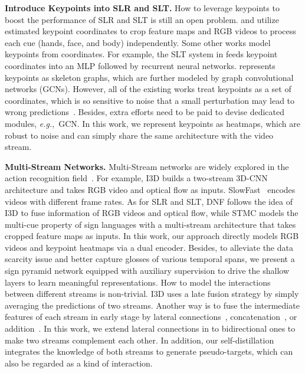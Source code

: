 \documentclass{article}
\def\eg{\emph{e.g.}} \def\Eg{\emph{E.g.}}
\begin{document}
\textbf{Introduce Keypoints into SLR and SLT.}
How to leverage keypoints to boost the performance of SLR and SLT is still an open problem.
\cite{STMC_MM} and \cite{papadimitriou20_interspeech} utilize estimated keypoint coordinates to crop feature maps and RGB videos to process each cue (hands, face, and body) independently.
Some other works \cite{NSLT_keypoint, Camg2020Multichannel, mseqgraph} model keypoints from coordinates.
For example, the SLT system in \cite{NSLT_keypoint} feeds keypoint coordinates into an MLP followed by recurrent neural networks. \cite{mseqgraph} represents keypoints as skeleton graphs, which are further modeled by graph convolutional networks (GCNs).
However, all of the existing works treat keypoints as a set of coordinates, which is so sensitive to noise that a small perturbation may lead to wrong predictions~\cite{duan2021revisiting}.
Besides, extra efforts need to be paid to devise dedicated modules, \eg,~GCN.
In this work, we represent keypoints as heatmaps, which are robust to noise and can simply share the same architecture with the video stream.

\textbf{Multi-Stream Networks.} Multi-Stream networks are widely explored in the action recognition field~\cite{simonyan2014two, feichtenhofer2016convolutional, carreira2017quo, zolfaghari2017chained, feichtenhofer2019slowfast}. For example, I3D \cite{carreira2017quo} builds a two-stream 3D-CNN architecture and takes RGB video and optical flow as inputs. SlowFast~\cite{feichtenhofer2019slowfast} encodes videos with different frame rates. As for SLR and SLT, DNF \cite{dnf_cui} follows the idea of I3D to fuse information of RGB videos and optical flow, while STMC \cite{STMC_MM} models the multi-cue property of sign languages with a multi-stream architecture that takes cropped feature maps as inputs. In this work, our approach directly models RGB videos and keypoint heatmaps via a dual encoder. Besides, to alleviate the data scarcity issue and better capture glosses of various temporal spans, we present a sign pyramid network equipped with auxiliary supervision to drive the shallow layers to learn meaningful representations. 
How to model the interactions between different streams is non-trivial.
I3D \cite{carreira2017quo} uses a late fusion strategy by simply averaging the predictions of two streams.
Another way is to fuse the intermediate features of each stream in early stage by lateral connections~\cite{feichtenhofer2019slowfast}, concatenation~\cite{STMC_MM}, or addition~\cite{dnf_cui}.
In this work, we extend lateral connections in \cite{feichtenhofer2019slowfast} to bidirectional ones to make two streams complement each other.
In addition, our self-distillation integrates the knowledge of both streams to generate pseudo-targets, which can also be regarded as a kind of interaction. 
\end{document}
